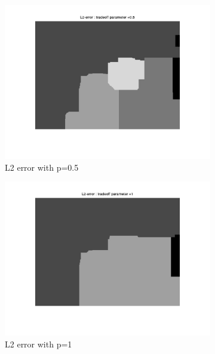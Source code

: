 \documentclass[fleqn]{article}
\begin{document}
\begin{figure}
 \begin{subfigure}{0.5\textwidth}
\includegraphics[scale=0.2]{./pics/tsukuba_L2_error_p=0.5.jpg}
\caption{L2 error with p=0.5}
\end{subfigure}
 \begin{subfigure}{0.5\textwidth}
\includegraphics[scale=0.2]{./pics/tsukuba_L2_error_p=1.jpg}
\caption{L2 error with p=1}
\end{subfigure}
 \begin{subfigure}{0.5\textwidth}

\end{subfigure}
\end{figure}
\end{document}
